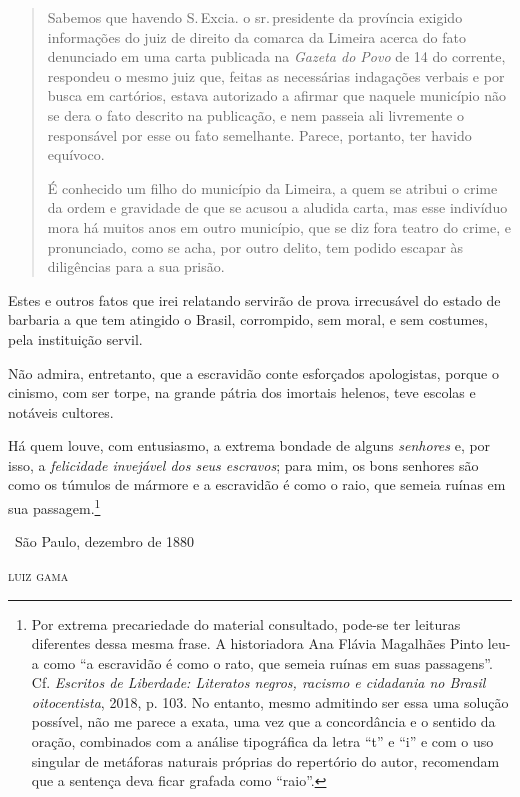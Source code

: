 {\begin{quote}
Sabemos que havendo S.\,Excia. o sr.\,presidente da província exigido
informações do juiz de direito da comarca da Limeira acerca do
fato denunciado em uma carta publicada na \emph{Gazeta do Povo} de 14 do
corrente, respondeu o mesmo juiz que, feitas as necessárias indagações
verbais e por busca em cartórios, estava autorizado a afirmar que
naquele município não se dera o fato descrito na publicação, e nem
passeia ali livremente o responsável por esse ou fato semelhante.
Parece, portanto, ter havido equívoco.

É conhecido um filho do município da Limeira, a quem se atribui o crime
da ordem e gravidade de que se acusou a aludida carta, mas esse
indivíduo mora há muitos anos em outro município, que se diz fora teatro
do crime, e pronunciado, como se acha, por outro delito, tem podido
escapar às diligências para a sua prisão.
\end{quote}

Estes e outros fatos que irei relatando servirão de prova irrecusável do
estado de barbaria a que tem atingido o Brasil, corrompido, sem moral, e
sem costumes, pela instituição servil.

Não admira, entretanto, que a escravidão conte esforçados apologistas,
porque o cinismo, com ser torpe, na grande pátria dos imortais helenos,
teve escolas e notáveis cultores.

Há quem louve, com entusiasmo, a extrema bondade de alguns
\emph{senhores} e, por isso, a \emph{felicidade invejável dos seus
escravos}; para mim, os bons senhores são como os túmulos de mármore e a
escravidão é como o raio, que semeia ruínas em sua passagem.\footnote{
  Por extrema precariedade do material consultado, pode-se ter leituras
  diferentes dessa mesma frase. A historiadora Ana Flávia Magalhães
  Pinto leu-a como ``a escravidão é como o rato, que semeia ruínas em
  suas passagens''. Cf. \emph{Escritos de Liberdade: Literatos negros,
  racismo e cidadania no Brasil oitocentista}, 2018, p. 103. No entanto,
mesmo admitindo ser essa uma solução possível, não me parece a exata,
uma vez que a concordância e o sentido da oração, combinados com a análise tipográfica da letra ``t'' e
  ``i'' e com o uso singular de metáforas naturais
  próprias do repertório do autor, recomendam que a sentença deva ficar
  grafada como ``raio''.}

\hfill\ São Paulo, dezembro de 1880

\hfill\textsc{luiz gama}


}
